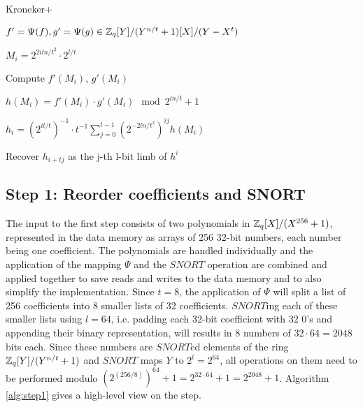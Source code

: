 \begin{algorithm}
  \caption{Kroneker+}
  \begin{algorithmic}[1]
  

      \State $f' = \Psi(f), g'= \Psi(g) \in \mathbb{Z}_q[Y]/(Y^{n/t} + 1)[X]/(Y-X^t)$

      \State $M_i = 2^{2iln/t^2} \cdot 2^{l/t}$ 

      \State Compute $f'(M_i)$, $g'(M_i)$ 

      \State $h(M_i) = f'(M_i) \cdot g'(M_i) \mod 2^{ln/t} + 1$ 

      \State $h_i = (2^{il/t})^{-1} \cdot t^{-1} \sum_{j=0}^{t-1} (2^{-2ln/t^2})^{ij} h(M_i)$ 
  
      \State Recover $h_{i + tj}$ as the j-th l-bit limb of $h^i$ 

  \EndProcedure
  
  \end{algorithmic}
\end{algorithm}

\subsection{Step 1: Reorder coefficients and SNORT} \label{steps:1}

The input to the first step consists of two polynomials in $\mathbb{Z}_q[X]/(X^{256} + 1)$, represented in the data memory as arrays of 256 32-bit numbers, each number being one coefficient. The polynomials are handled individually and the application of the mapping $\Psi$ and the $SNORT$ operation are combined and applied together to save reads and writes to the data memory and to also simplify the implementation. Since $t = 8$, the application of $\Psi$ will split a list of 256 coefficients into 8 smaller lists of 32 coefficients. $SNORT$ing each of these smaller lists using $l=64$, i.e. padding each 32-bit coefficient with 32 0's and appending their binary representation, will results in 8 numbers of $32 \cdot 64 = 2048$ bits each. Since these numbers are $SNORT$ed elements of the ring $\mathbb{Z}_q[Y]/(Y^{n/t} + 1)$ and $SNORT$ maps $Y$ to $2^l = 2^{64}$, all operations on them need to be performed modulo $(2^{(256 / 8)})^{64} + 1 = 2^{32 \cdot 64} + 1 = 2^{2048} + 1$. Algorithm \ref{alg:step1} gives a high-level view on the step.

